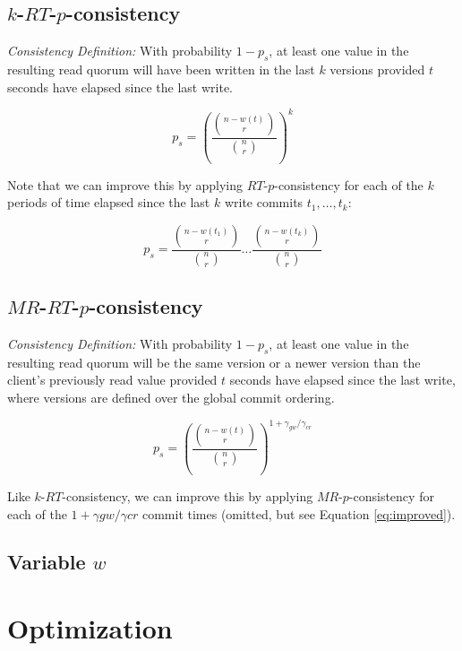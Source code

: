 \documentclass{vldb}
\begin{document}
\subsection{$k$-$RT$-$p$-consistency}

\noindent\textit{Consistency Definition:} With probability $1-p_s$, at
least one value in the resulting read quorum will have been written in the last
$k$ versions provided $t$ seconds have elapsed since the last write.

\begin{equation}
p_s = \left(\frac{{n-w(t) \choose r}}{{n \choose r}}\right)^k
\end{equation}

\noindent Note that we can improve this by applying
$RT$-$p$-consistency for each of the $k$ periods of time elapsed since
the last $k$ write commits $t_1,\dots,t_k$:

\begin{equation}
p_s = \frac{{n-w(t_1) \choose r}}{{n \choose r}}\dots\frac{{n-w(t_k) \choose r}}{{n \choose r}}
\end{equation}

\subsection{$MR$-$RT$-$p$-consistency}

\noindent\textit{Consistency Definition:} With probability $1-p_s$, at
least one value in the resulting read quorum will be the same version or a newer
version than the client's previously read value provided $t$ seconds
have elapsed since the last write, where versions are defined over the
global commit ordering.

\begin{equation}
\label{eq:improved}
p_s = \left(\frac{{n-w(t) \choose r}}{{n \choose r}}\right)^{1+\gamma_{gw}/\gamma_{cr}}
\end{equation}

Like $k$-$RT$-consistency, we can improve this by applying $MR$-$p$-consistency for each of the $1+\gamma{gw}/\gamma{cr}$ commit times (omitted, but see Equation \ref{eq:improved}).

\subsection{Variable $w$}

\section{Optimization}
\label{sec:optimize}
\end{document}
